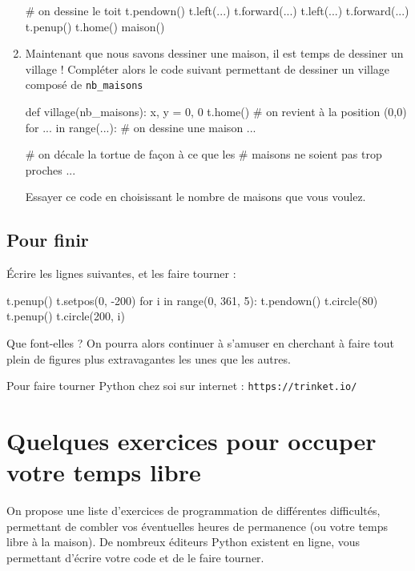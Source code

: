 \documentclass[12pt,a4paper, oneside]{article}
\theoremstyle{definition}
\begin{document}
\begin{enumerate}
\begin{pyverbatim}
         # on dessine le toit
         t.pendown()
         t.left(...)
         t.forward(...)
         t.left(...)
         t.forward(...)
         t.penup()
         t.home()
      maison()
            \end{pyverbatim}
         \item Maintenant que nous savons dessiner une maison, il est temps de dessiner un village !
         Compléter alors le code suivant permettant de dessiner un village composé de \texttt{nb\_maisons}
      \begin{pyverbatim}
      def village(nb_maisons):
         x, y = 0, 0
         t.home()  # on revient à la position (0,0)
         for ... in range(...):
            # on dessine une maison
            ...

            # on décale la tortue de façon à ce que les
            # maisons ne soient pas trop proches
            ...
      \end{pyverbatim}
         Essayer ce code en choisissant le nombre de maisons que vous voulez.
      \end{enumerate}

   \subsection{Pour finir}\label{subsec:pour-finir}
      Écrire les lignes suivantes, et les faire tourner :
      \begin{pyverbatim}
         t.penup()
         t.setpos(0, -200)
         for i in range(0, 361, 5):
           t.pendown()
           t.circle(80)
           t.penup()
           t.circle(200, i)
      \end{pyverbatim}

      Que font-elles ?
      On pourra alors continuer à s'amuser en cherchant à faire tout plein de figures plus extravagantes les unes que les autres.

      Pour faire tourner Python chez soi sur internet : \texttt{https://trinket.io/}

      \newpage

\section{Quelques exercices pour occuper votre temps libre}\label{sec:quelques-exercices-pour-occuper-votre-temps-libre}
   On propose une liste d'exercices de programmation de différentes difficultés, permettant de combler vos éventuelles heures de permanence (ou votre temps libre à la maison).
   De nombreux éditeurs Python existent en ligne, vous permettant d'écrire votre code et de le faire tourner.
\end{document}
